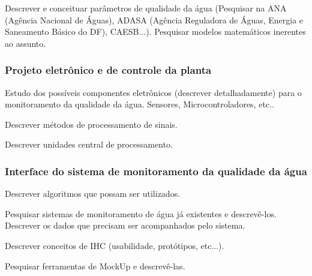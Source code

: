     Descrever e conceituar parâmetros de qualidade da água
    (Pesquisar na ANA (Agência Nacional de Águas), ADASA (Agência Reguladora de Águas, Energia e Saneamento Básico do DF), CAESB...).
    Pesquisar modelos matemáticos inerentes ao assunto.
  
    \subsubsection{Projeto eletrônico e de controle da planta}
    
    Estudo dos possíveis componentes eletrônicos (descrever detalhadamente) para o monitoramento da qualidade da água.
      Sensores, Microcontroladores, etc..
      
    Descrever métodos de processamento de sinais.
    
    Descrever unidades central de processamento.
    
    \subsubsection{Interface do sistema de monitoramento da qualidade da água}
    
    Descrever algoritmos que possam ser utilizados.
    
    Pesquisar sistemas de monitoramento de água já existentes e descrevê-los.
    Descrever os dados que precisam ser acompanhados pelo sistema.
    
    Descrever conceitos de IHC (usabilidade, protótipos, etc...).
    
    Pesquisar ferramentas de MockUp e descrevê-las.
    
    
    
    
    
    
